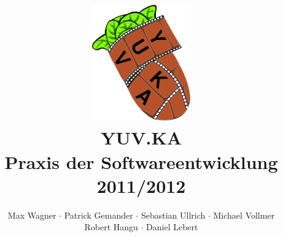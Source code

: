 \documentclass{scrartcl}
\begin{document}
\title{
    \hspace{-0.5cm} \includegraphics[height=5cm]{resources/logo.png} \\[1cm]
    \Huge{YUV.KA} \\ \large{Praxis der Softwareentwicklung 2011/2012}
}
\author{Max Wagner $\cdot$ Patrick Gemander $\cdot$ Sebastian Ullrich $\cdot$ Michael Vollmer \\ Robert Hangu $\cdot$ Daniel Lebert}
\maketitle

\newpage
\mbox{}
\newpage
\mbox{}

\tableofcontents
\newpage
\mbox{}
\newpage













\end{document}
